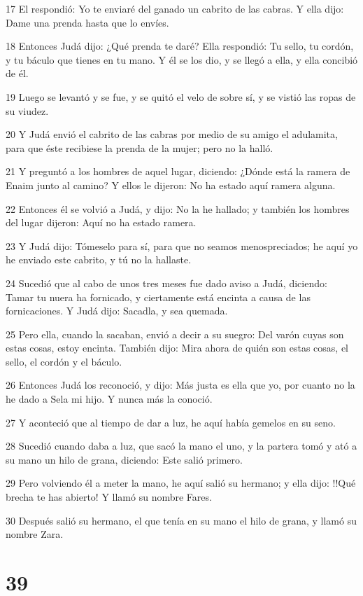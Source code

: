 \par 17 El respondió: Yo te enviaré del ganado un cabrito de las cabras. Y ella dijo: Dame una prenda hasta que lo envíes.
\par 18 Entonces Judá dijo: ¿Qué prenda te daré? Ella respondió: Tu sello, tu cordón, y tu báculo que tienes en tu mano. Y él se los dio, y se llegó a ella, y ella concibió de él.
\par 19 Luego se levantó y se fue, y se quitó el velo de sobre sí, y se vistió las ropas de su viudez.
\par 20 Y Judá envió el cabrito de las cabras por medio de su amigo el adulamita, para que éste recibiese la prenda de la mujer; pero no la halló.
\par 21 Y preguntó a los hombres de aquel lugar, diciendo: ¿Dónde está la ramera de Enaim junto al camino? Y ellos le dijeron: No ha estado aquí ramera alguna.
\par 22 Entonces él se volvió a Judá, y dijo: No la he hallado; y también los hombres del lugar dijeron: Aquí no ha estado ramera.
\par 23 Y Judá dijo: Tómeselo para sí, para que no seamos menospreciados; he aquí yo he enviado este cabrito, y tú no la hallaste.
\par 24 Sucedió que al cabo de unos tres meses fue dado aviso a Judá, diciendo: Tamar tu nuera ha fornicado, y ciertamente está encinta a causa de las fornicaciones. Y Judá dijo: Sacadla, y sea quemada.
\par 25 Pero ella, cuando la sacaban, envió a decir a su suegro: Del varón cuyas son estas cosas, estoy encinta. También dijo: Mira ahora de quién son estas cosas, el sello, el cordón y el báculo.
\par 26 Entonces Judá los reconoció, y dijo: Más justa es ella que yo, por cuanto no la he dado a Sela mi hijo. Y nunca más la conoció.
\par 27 Y aconteció que al tiempo de dar a luz, he aquí había gemelos en su seno.
\par 28 Sucedió cuando daba a luz, que sacó la mano el uno, y la partera tomó y ató a su mano un hilo de grana, diciendo: Este salió primero.
\par 29 Pero volviendo él a meter la mano, he aquí salió su hermano; y ella dijo: !!Qué brecha te has abierto! Y llamó su nombre Fares.
\par 30 Después salió su hermano, el que tenía en su mano el hilo de grana, y llamó su nombre Zara.

\chapter{39}

